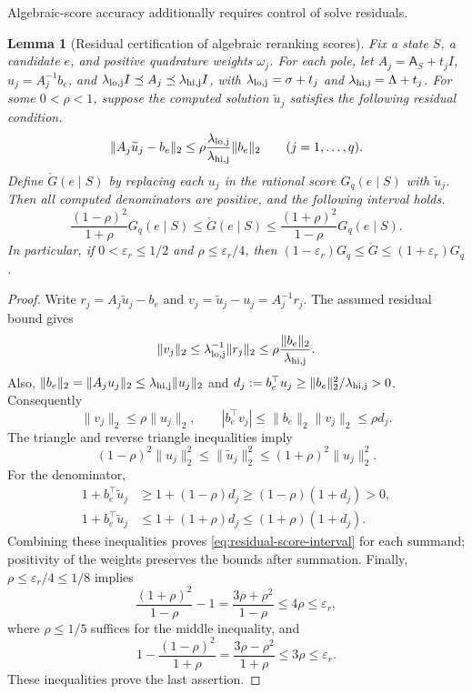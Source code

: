 \documentclass[conference]{IEEEtran}
\newtheorem{lemma}{Lemma}
\theoremstyle{definition}
\newcommand{\matA}{\mathsf A}
\begin{document}
Algebraic-score accuracy additionally requires control of solve residuals.

\begin{lemma}[Residual certification of algebraic reranking scores]
\label{lem:residual-score}
Fix a state $S$, a candidate $e$, and positive quadrature weights
$\omega_j$. For each pole, let $A_j=\matA_S+t_jI$,
$u_j=A_j^{-1}b_e$, and $\lambda_{\rm lo,j}I\preceq A_j\preceq \lambda_{\rm hi,j}I$,
with $\lambda_{\rm lo,j}=\sigma+t_j$ and $\lambda_{\rm hi,j}=\Lambda+t_j$.
For some $0<\rho<1$, suppose the computed solution
$\widetilde u_j$ satisfies the following residual condition.
\begin{equation}
 \|A_j\widetilde u_j-b_e\|_2
 \leq\rho\frac{\lambda_{\rm lo,j}}{\lambda_{\rm hi,j}}\|b_e\|_2
 \qquad(j=1,\ldots,q).
 \label{eq:score-residual-target}
\end{equation}
Define $\check G(e\mid S)$ by replacing each $u_j$ in the
rational score $G_q(e\mid S)$ with $\widetilde u_j$. Then all
computed denominators are positive, and the following interval holds.
\begin{equation}
 \frac{(1-\rho)^2}{1+\rho}G_q(e\mid S)
 \leq\check G(e\mid S)
 \leq\frac{(1+\rho)^2}{1-\rho}G_q(e\mid S).
 \label{eq:residual-score-interval}
\end{equation}
In particular, if $0<\varepsilon_r\leq1/2$ and
$\rho\leq\varepsilon_r/4$, then
$(1-\varepsilon_r)G_q\leq\check G\leq(1+\varepsilon_r)G_q$.
\end{lemma}
\begin{proof}
Write $r_j=A_j\widetilde u_j-b_e$ and
$v_j=\widetilde u_j-u_j=A_j^{-1}r_j$.
The assumed residual bound gives
\[
 \|v_j\|_2\leq \lambda_{\rm lo,j}^{-1}\|r_j\|_2
              \leq\rho\frac{\|b_e\|_2}{\lambda_{\rm hi,j}}.
\]
Also, $\|b_e\|_2=\|A_ju_j\|_2\leq \lambda_{\rm hi,j}\|u_j\|_2$ and
$d_j:=b_e^\top u_j\geq\|b_e\|_2^2/\lambda_{\rm hi,j}>0$.
Consequently
\[
 \|v_j\|_2\leq\rho\|u_j\|_2,
 \qquad
 |b_e^\top v_j|\leq\|b_e\|_2\|v_j\|_2\leq\rho d_j.
\]
The triangle and reverse triangle inequalities imply
\[
 (1-\rho)^2\|u_j\|_2^2\leq\|\widetilde u_j\|_2^2
                              \leq(1+\rho)^2\|u_j\|_2^2.
\]
For the denominator,
\begin{align*}
 1+b_e^\top\widetilde u_j
 &\geq1+(1-\rho)d_j\geq(1-\rho)(1+d_j)>0,\\
 1+b_e^\top\widetilde u_j
 &\leq1+(1+\rho)d_j\leq(1+\rho)(1+d_j).
\end{align*}
Combining these inequalities proves
\eqref{eq:residual-score-interval} for each summand; positivity of
the weights preserves the bounds after summation.
Finally, $\rho\leq\varepsilon_r/4\leq1/8$ implies
\[
 \frac{(1+\rho)^2}{1-\rho}-1
 =\frac{3\rho+\rho^2}{1-\rho}\leq4\rho\leq\varepsilon_r,
\]
where $\rho\leq1/5$ suffices for the middle inequality, and
\[
 1-\frac{(1-\rho)^2}{1+\rho}
 =\frac{3\rho-\rho^2}{1+\rho}\leq3\rho\leq\varepsilon_r.
\]
These inequalities prove the last assertion.
\end{proof}
\end{document}
